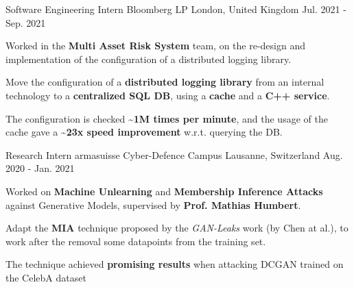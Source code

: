 

\begin{cventries}

  \cventry
  {Software Engineering Intern} %
  {Bloomberg LP} %
  {London, United Kingdom} %
  {Jul. 2021 - Sep. 2021} %
  {
    \begin{cvitems} %
      \item Worked in the \textbf{Multi Asset Risk System} team, on the re-design and implementation of the configuration of a distributed logging library.
      \item Move the configuration of a \textbf{distributed logging library} from an internal technology to a \textbf{centralized SQL DB}, using a \textbf{cache} and a \textbf{C++ service}.
      \item The configuration is checked \textbf{\textasciitilde 1M times per minute}, and the usage of the cache gave a \textbf{\textasciitilde 23x speed improvement} w.r.t. querying the DB.
    \end{cvitems}
  }

  \cventry
  {Research Intern} %
  {armasuisse Cyber-Defence Campus} %
  {Lausanne, Switzerland} %
  {Aug. 2020 - Jan. 2021} %
  {
    \begin{cvitems} %
      \item Worked on \textbf{Machine Unlearning} and \textbf{Membership Inference Attacks} against Generative Models, supervised by \textbf{Prof. Mathias Humbert}.
      \item Adapt the \textbf{MIA} technique proposed by the \textit{GAN-Leaks} work (by Chen at al.), to work after the removal some datapoints from the training set.
      \item The technique achieved \textbf{promising results} when attacking DCGAN trained on the CelebA dataset
    \end{cvitems}
  }


\end{cventries}
